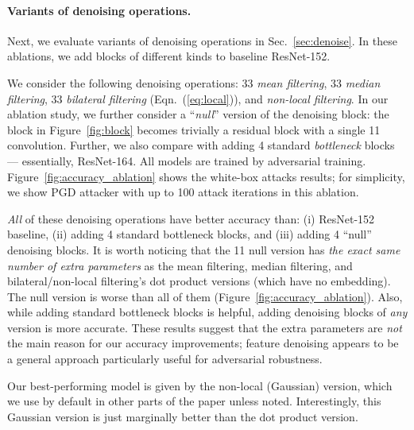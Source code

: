 \documentclass[10pt,twocolumn,letterpaper]{article}
\begin{document}
\paragraph{Variants of denoising operations.} Next, we evaluate variants of denoising operations in Sec.~\ref{sec:denoise}. In these ablations, we add blocks of different kinds to baseline ResNet-152.

We consider the following denoising operations: 33 \emph{mean filtering}, 33 \emph{median filtering}, 33 \emph{bilateral filtering} (Eqn.~(\ref{eq:local})), and \emph{non-local filtering}.
In our ablation study, we further consider a ``\emph{null}'' version of the denoising block: the block in Figure~\ref{fig:block} becomes trivially a residual block with a single 11 convolution.
Further, we also compare with adding 4 standard \emph{bottleneck} \cite{He2016} blocks --- essentially, ResNet-164.
All models are trained by adversarial training.
Figure~\ref{fig:accuracy_ablation} shows the white-box attacks results; for simplicity, we show PGD attacker with up to 100 attack iterations in this ablation.

\emph{All} of these denoising operations have better accuracy than: (i) ResNet-152 baseline, (ii) adding 4 standard bottleneck blocks, and (iii) adding 4 ``null'' denoising blocks. It is worth noticing that the 11 null version has \emph{the exact same number of extra parameters} as the mean filtering, median filtering, and bilateral/non-local filtering's dot product versions (which have no embedding).
The null version is worse than all of them (Figure~\ref{fig:accuracy_ablation}).
Also, while adding standard bottleneck blocks is helpful, adding denoising blocks of \emph{any} version is more accurate.
These results suggest that the extra parameters are \emph{not} the main reason for our accuracy improvements; feature denoising appears to be a general approach particularly useful for adversarial robustness.

Our best-performing model is given by the non-local (Gaussian) version, which we use by default in other parts of the paper unless noted. Interestingly, this Gaussian version is just marginally better than the dot product version.
\end{document}
